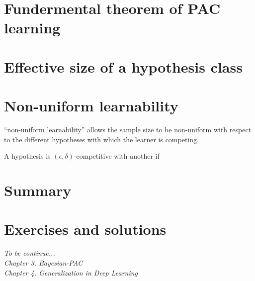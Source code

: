 \documentclass{article}
\begin{document}
\section{Fundermental theorem of PAC learning}
%
%
%
%
%
%
%
%
%
%
%
%
%
%
%
%
%
\section{Effective size of a hypothesis class}

\section{Non-uniform learnability}

“non-uniform learnability” allows the sample size to be non-uniform with respect to the different hypotheses with which the learner is competing. 

A hypothesis is $(\epsilon, \delta)$-competitive with another if
\section{Summary}
%


\section{Exercises and solutions}

\textit{
      To be continue...\\
      Chapter 3. Bayesian-PAC\\
      Chapter 4. Generalization in Deep Learning}
\end{document}
